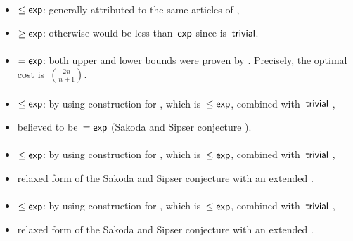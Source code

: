 \paragraph{\TNFA{}\tto\ODFA}\label{cost:2NFAto1DFA}
\begin{itemize}
	\item $\le\mathsf{exp}$: generally attributed to the same articles of \hyperref[cost:2DFAto1DFA]{\TDFA{}\tto\ODFA},
	\item $\ge\mathsf{exp}$: otherwise \hyperref[cost:1NFAto1DFA]{\ONFA{}\tto\ODFA} would be less than~$\mathsf{exp}$ since \ONFA{}\tto\TNFA is~$\mathsf{trivial}$.
\end{itemize}
\paragraph{\TNFA{}\tto\ONFA}
\begin{itemize}
	\item $=\mathsf{exp}$: both upper and lower bounds were proven by . Precisely, the optimal cost is~$\binom{2n}{n+1}$.
\end{itemize}
\paragraph{\TNFA{}\tto\TDFA}
\begin{itemize}
	\item $\le\mathsf{exp}$: by using construction for \hyperref[cost:2NFAto1DFA]{\TNFA{}\tto\ODFA}, which is~$\le\mathsf{exp}$, combined with~$\mathsf{trivial}$ \ODFA{}\tto\TDFA,
	\item believed to be~$=\mathsf{exp}$ (Sakoda and Sipser conjecture \cite{SakSip78}).
\end{itemize}
\paragraph{\ONFA{}\tto\ODLA}
\begin{itemize}
	\item $\le\mathsf{exp}$: by using construction for \hyperref[cost:1NFAto1DFA]{\ONFA{}\tto\ODFA}, which is~$\le\mathsf{exp}$, combined with~$\mathsf{trivial}$ \ODFA{}\tto\ODLA,
	\item relaxed form of the Sakoda and Sipser conjecture with an extended \TDFA.
\end{itemize}
\paragraph{\TNFA{}\tto\ODLA}
\begin{itemize}
	\item $\le\mathsf{exp}$: by using construction for \hyperref[cost:2NFAto1DFA]{\TNFA{}\tto\ODFA}, which is~$\le\mathsf{exp}$, combined with~$\mathsf{trivial}$ \ODFA{}\tto\ODLA,
	\item relaxed form of the Sakoda and Sipser conjecture with an extended \TDFA.
\end{itemize}
